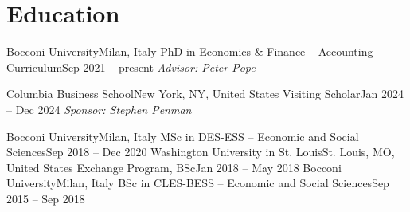 \section{Education}
  \resumeSubHeadingListStart
    \resumeSubheading
      {Bocconi University}{Milan, Italy}
      {PhD in Economics \& Finance – Accounting Curriculum}{Sep 2021 -- present}
      \textit{\footnotesize Advisor: Peter Pope}

      \vspace{2.0mm}

    \resumeSubheading
      {Columbia Business School}{New York, NY, United States}
      {Visiting Scholar}{Jan 2024 -- Dec 2024}
      \textit{\footnotesize Sponsor: Stephen Penman}
      
      \vspace{2.0mm}

    \resumeSubheading
      {Bocconi University}{Milan, Italy}
      {MSc in DES-ESS – Economic and Social Sciences}{Sep 2018 -- Dec 2020}
    \resumeSubheading
      {Washington University in St. Louis}{St. Louis, MO, United States}
      {Exchange Program, BSc}{Jan 2018 – May 2018}
    \resumeSubheading
      {Bocconi University}{Milan, Italy}
      {BSc in CLES-BESS – Economic and Social Sciences}{Sep 2015 -- Sep 2018}
  \resumeSubHeadingListEnd
